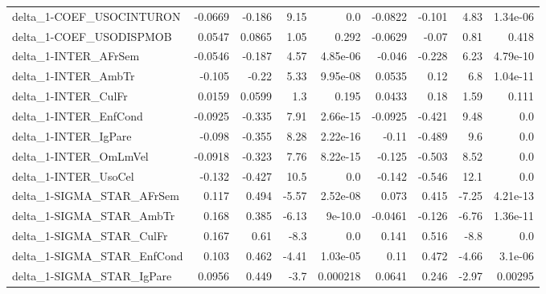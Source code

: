 \begin{tabular}{lrrrrrrrr}
delta\_1-COEF\_USOCINTURON              &     -0.0669 &       -0.186 &     9.15 &      0.0 &    -0.0822 &      -0.101 &         4.83 &      1.34e-06 \\
delta\_1-COEF\_USODISPMOB               &      0.0547 &       0.0865 &     1.05 &    0.292 &    -0.0629 &       -0.07 &         0.81 &         0.418 \\
delta\_1-INTER\_AFrSem                  &     -0.0546 &       -0.187 &     4.57 & 4.85e-06 &     -0.046 &      -0.228 &         6.23 &      4.79e-10 \\
delta\_1-INTER\_AmbTr                   &      -0.105 &        -0.22 &     5.33 & 9.95e-08 &     0.0535 &        0.12 &          6.8 &      1.04e-11 \\
delta\_1-INTER\_CulFr                   &      0.0159 &       0.0599 &      1.3 &    0.195 &     0.0433 &        0.18 &         1.59 &         0.111 \\
delta\_1-INTER\_EnfCond                 &     -0.0925 &       -0.335 &     7.91 & 2.66e-15 &    -0.0925 &      -0.421 &         9.48 &           0.0 \\
delta\_1-INTER\_IgPare                  &      -0.098 &       -0.355 &     8.28 & 2.22e-16 &      -0.11 &      -0.489 &          9.6 &           0.0 \\
delta\_1-INTER\_OmLmVel                 &     -0.0918 &       -0.323 &     7.76 & 8.22e-15 &     -0.125 &      -0.503 &         8.52 &           0.0 \\
delta\_1-INTER\_UsoCel                  &      -0.132 &       -0.427 &     10.5 &      0.0 &     -0.142 &      -0.546 &         12.1 &           0.0 \\
delta\_1-SIGMA\_STAR\_AFrSem             &       0.117 &        0.494 &    -5.57 & 2.52e-08 &      0.073 &       0.415 &        -7.25 &      4.21e-13 \\
delta\_1-SIGMA\_STAR\_AmbTr              &       0.168 &        0.385 &    -6.13 &  9e-10.0 &    -0.0461 &      -0.126 &        -6.76 &      1.36e-11 \\
delta\_1-SIGMA\_STAR\_CulFr              &       0.167 &         0.61 &     -8.3 &      0.0 &      0.141 &       0.516 &         -8.8 &           0.0 \\
delta\_1-SIGMA\_STAR\_EnfCond            &       0.103 &        0.462 &    -4.41 & 1.03e-05 &       0.11 &       0.472 &        -4.66 &       3.1e-06 \\
delta\_1-SIGMA\_STAR\_IgPare             &      0.0956 &        0.449 &     -3.7 & 0.000218 &     0.0641 &       0.246 &        -2.97 &       0.00295 \\

\end{tabular}

